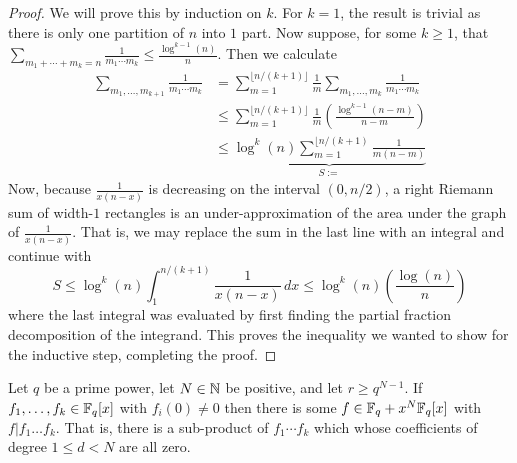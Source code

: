 \begin{proof}
We will prove this by induction on $k$.
For $k=1$, the result is trivial as there is only one partition of $n$ into $1$ part.
Now suppose, for some $k\ge 1$, that $\sum_{m_1+\cdots+m_k=n} \frac{1}{m_1\cdots m_k} \le \frac{\log^{k-1}(n)}{n}$.
Then we calculate
\begin{align*}
\sum_{m_1,\dots,m_{k+1}} \frac{1}{m_1\cdots m_k} 
&= \sum_{m=1}^{\lfloor n/(k+1) \rfloor} \frac{1}{m} \sum_{m_1,\dots,m_k} \frac{1}{m_1\cdots m_k} \tag{inner sum taken over partitions of $n-m$}\\
&\le \sum_{m=1}^{\lfloor n/(k+1)\rfloor} \frac{1}{m} \left( \frac{\log^{k-1}(n-m)}{n-m} \right) \\
&\le \underbrace{\log^k(n) \sum_{m=1}^{\lfloor n/(k+1)} \frac{1}{m(n-m)}}_{S:=}
\end{align*}
Now, because $\frac{1}{x(n-x)}$ is decreasing on the interval $(0,n/2)$, a right Riemann sum of width-$1$ rectangles is an under-approximation of the area under the graph of $\frac{1}{x(n-x)}$.
That is, we may replace the sum in the last line with an integral and continue with
\[
S \le \log^k(n) \int_1^{n/(k+1)} \frac{1}{x(n-x)} \, dx 
\le \log^k(n) \left(\frac{\log(n)}{n}\right) 
\]
where the last integral was evaluated by first finding the partial fraction decomposition of the integrand.
This proves the inequality we wanted to show for the inductive step, completing the proof.
\end{proof}

\begin{lemma}\label{lem:coefficient gap boosting}
Let $q$ be a prime power, let $N\in\mathbb{N}$ be positive, and let $r \ge q^{N-1}$.
If $f_1,\dots,f_k\in \mathbb{F}_q[x]$ with $f_i(0)\neq 0$ then there is some $f\in \mathbb{F}_q + x^N \mathbb{F}_q[x]$ with $f | f_1\dots f_k$.
That is, there is a sub-product of $f_1\cdots f_k$ which whose coefficients of degree $1\le d < N$ are all zero.
\end{lemma}


